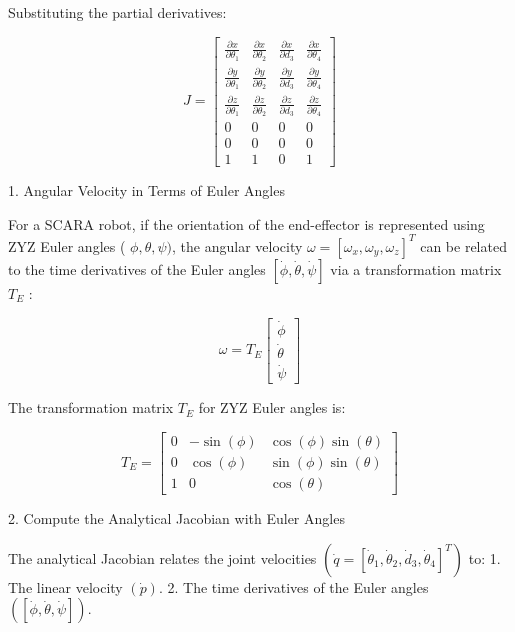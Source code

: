 \documentclass[12pt]{report}
\begin{document}
Substituting the partial derivatives:

\begin{equation}
	J =
	\begin{bmatrix}
		\frac{\partial x}{\partial \theta_1} & \frac{\partial x}{\partial \theta_2} & \frac{\partial x}{\partial d_3} & \frac{\partial x}{\partial \theta_4} \\
		\frac{\partial y}{\partial \theta_1} & \frac{\partial y}{\partial \theta_2} & \frac{\partial y}{\partial d_3} & \frac{\partial y}{\partial \theta_4} \\
		\frac{\partial z}{\partial \theta_1} & \frac{\partial z}{\partial \theta_2} & \frac{\partial z}{\partial d_3} & \frac{\partial z}{\partial \theta_4} \\
		0 & 0 & 0 & 0 \\
		0 & 0 & 0 & 0 \\
		1 & 1 & 0 & 1
	\end{bmatrix}
\end{equation}

1. Angular Velocity in Terms of Euler Angles

For a SCARA robot, if the orientation of the end-effector is represented using ZYZ Euler angles ( $\phi, \theta, \psi)$, the angular velocity $\omega=\left[\omega_x, \omega_y, \omega_z\right]^T$ can be related to the time derivatives of the Euler angles $[\dot{\phi}, \dot{\theta}, \dot{\psi}]$ via a transformation matrix $T_E$ :

\begin{equation}
	\omega = T_E
	\begin{bmatrix}
		\dot{\phi} \\
		\dot{\theta} \\
		\dot{\psi}
	\end{bmatrix}
\end{equation}


The transformation matrix $T_E$ for ZYZ Euler angles is:

\begin{equation}
	T_E =
	\begin{bmatrix}
		0 & -\sin (\phi) & \cos (\phi) \sin (\theta) \\
		0 & \cos (\phi) & \sin (\phi) \sin (\theta) \\
		1 & 0 & \cos (\theta)
	\end{bmatrix}
\end{equation}

2. Compute the Analytical Jacobian with Euler Angles

The analytical Jacobian relates the joint velocities $\left(\dot{q}=\left[\dot{\theta}_1, \dot{\theta}_2, \dot{d}_3, \dot{\theta}_4\right]^T\right)$ to:
1. The linear velocity $(\dot{p})$.
2. The time derivatives of the Euler angles $([\dot{\phi}, \dot{\theta}, \dot{\psi}])$.
\end{document}
